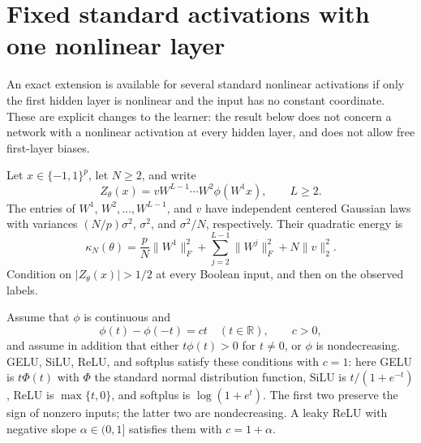 \section{Fixed standard activations with one nonlinear layer}
\label{sec:mixed-activation}

An exact extension is available for several standard nonlinear
activations if only the first hidden layer is nonlinear and the input
has no constant coordinate. These are explicit changes to the learner:
the result below does not concern a network with a nonlinear activation
at every hidden layer, and does not allow free first-layer biases.

Let $x\in\{-1,1\}^p$, let $N\ge2$, and write
\[
 Z_\theta(x)=vW^{L-1}\cdots W^2\phi(W^1x),\qquad L\ge2.
\]
The entries of $W^1$, $W^2,\ldots,W^{L-1}$, and $v$ have independent
centered Gaussian laws with variances $(N/p)\sigma^2$, $\sigma^2$,
and $\sigma^2/N$, respectively. Their quadratic energy is
\[
 \kappa_N(\theta)=\frac pN\|W^1\|_F^2+
 \sum_{j=2}^{L-1}\|W^j\|_F^2+N\|v\|_2^2.
\]
Condition on $|Z_\theta(x)|>1/2$ at every Boolean input,
and then on the observed labels.

Assume that $\phi$ is continuous and
\begin{equation}\label{eq:mixed-odd}
 \phi(t)-\phi(-t)=ct\quad(t\in\mathbb R),\qquad c>0,
\end{equation}
and assume in addition that either $t\phi(t)>0$ for $t\ne0$, or
$\phi$ is nondecreasing. GELU, SiLU, ReLU, and softplus satisfy these
conditions with $c=1$: here GELU is $t\Phi(t)$ with $\Phi$ the
standard normal distribution function, SiLU is $t/(1+e^{-t})$, ReLU is
$\max\{t,0\}$, and softplus is $\log(1+e^t)$. The first two preserve
the sign of nonzero inputs; the latter two are nondecreasing. A leaky ReLU with negative slope
$\alpha\in(0,1]$ satisfies them with $c=1+\alpha$.

